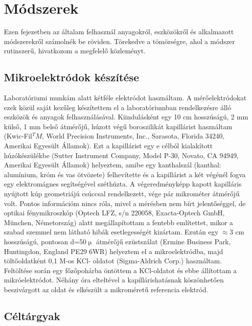 \chapter{Módszerek}
\pagestyle{headings}

Ezen fejezetben az általam felhasznál anyagokról, eszközökről és alkalmazott módszerekről számolnék be röviden. Törekedve a tömörségre, ahol a módszer rutinszerű, hivatkozom a megfelelő közleményt.

\section{Mikroelektródok készítése}

Laboratóriumi munkám alatt kétféle elektródot használtam. A mérőelektródokat ezek közül saját kezűleg készítettem el a laboratóriumban rendelkezésre álló eszközök és anyagok felhasználásával.
Kiindulásként egy 10 cm hosszúságú, 2 mm külső, 1 mm belső átmérőjű, húzott végű boroszilikát kapillárist használtam (Kwic-Fil$^TM$, World Precision Instruments, Inc., Sarasota, Florida 34240, Amerikai Egyesült Államok). Ezt a kapillárist egy e célból kialakított húzókészülékbe (Sutter Instrument Company, Model P-30, Novato, CA 94949, Amerikai Egyesült Államok) helyeztem, amibe egy kanthalszál (kanthal: alumínium, króm és vas ötvözete) felhevítette és a kapillárist a két végénél fogva egy elektromágnes segítségével széthúzta. A végeredményképp kapott kapilláris nyújtott kúp geometriájú csúccsal rendelkezett, vége pár mikrométer átmérőjű volt. Pontos információm nincs róla, mivel a mérésben nem bírt jelentőséggel, de optikai fénymikroszkóp (Optech LFZ, s/n 220058, Exacta-Optech GmbH, München, Németország) alatt megállapítottam a fentebb említettet, mikor a szabad szemmel nem látható hibák esetlegességét kizártam. Ezután egy $\approx$3 cm hosszúságú, pontosan d=50$\upmu$ átmérőjű ezüstszálat (Ermine Business Park, Huntingdon, England PE29 6WR) helyeztem el a mikroelektródba, majd töltőoldatként 0,1 M-os KCl- oldatot (Sigma-Aldrich Corp.) használtam. Feltöltése során egy főzőpohárba öntöttem a KCl-oldatot és ebbe állítottam a mikróelektródot. Néhány óra elteltével a kapillárishatásnak köszönhetően beszivárgott az oldat és elkészült a mikroméretű referencia elektród.

\section{Céltárgyak}


